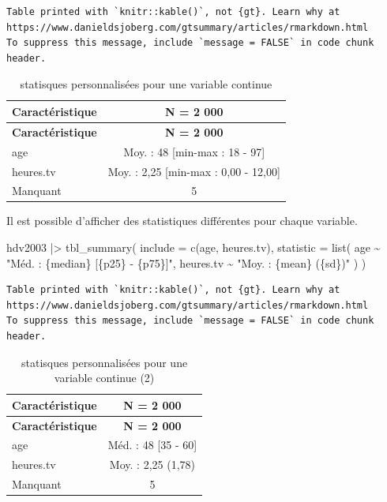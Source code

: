 \documentclass[
  letterpaper,
  DIV=11,
  numbers=noendperiod,
  oneside]{scrreprt}
\newenvironment{Shaded}{\begin{snugshade}}{\end{snugshade}}
\newcommand{\AttributeTok}[1]{\textcolor[rgb]{0.40,0.45,0.13}{#1}}
\newcommand{\FunctionTok}[1]{\textcolor[rgb]{0.28,0.35,0.67}{#1}}
\newcommand{\NormalTok}[1]{\textcolor[rgb]{0.00,0.23,0.31}{#1}}
\newcommand{\SpecialCharTok}[1]{\textcolor[rgb]{0.37,0.37,0.37}{#1}}
\newcommand{\StringTok}[1]{\textcolor[rgb]{0.13,0.47,0.30}{#1}}
\begin{document}
\begin{verbatim}
Table printed with `knitr::kable()`, not {gt}. Learn why at
https://www.danieldsjoberg.com/gtsummary/articles/rmarkdown.html
To suppress this message, include `message = FALSE` in code chunk header.
\end{verbatim}

\hypertarget{tbl-stat-var-cont}{}
\begin{longtable}[]{@{}lc@{}}
\caption{\label{tbl-stat-var-cont}statisques personnalisées pour une
variable continue}\tabularnewline
\toprule()
\textbf{Caractéristique} & \textbf{N = 2 000} \\
\midrule()
\endfirsthead
\toprule()
\textbf{Caractéristique} & \textbf{N = 2 000} \\
\midrule()
\endhead
age & Moy. : 48 {[}min-max : 18 - 97{]} \\
heures.tv & Moy. : 2,25 {[}min-max : 0,00 - 12,00{]} \\
Manquant & 5 \\
\bottomrule()
\end{longtable}

Il est possible d'afficher des statistiques différentes pour chaque
variable.

\begin{Shaded}
\begin{Highlighting}[]
\NormalTok{hdv2003 }\SpecialCharTok{|\textgreater{}}
  \FunctionTok{tbl\_summary}\NormalTok{(}
    \AttributeTok{include =} \FunctionTok{c}\NormalTok{(age, heures.tv),}
    \AttributeTok{statistic =} \FunctionTok{list}\NormalTok{(}
\NormalTok{      age }\SpecialCharTok{\textasciitilde{}} \StringTok{"Méd. : \{median\} [\{p25\} {-} \{p75\}]"}\NormalTok{,}
\NormalTok{      heures.tv }\SpecialCharTok{\textasciitilde{}} \StringTok{"Moy. : \{mean\} (\{sd\})"}
\NormalTok{    )}
\NormalTok{  )}
\end{Highlighting}
\end{Shaded}

\begin{verbatim}
Table printed with `knitr::kable()`, not {gt}. Learn why at
https://www.danieldsjoberg.com/gtsummary/articles/rmarkdown.html
To suppress this message, include `message = FALSE` in code chunk header.
\end{verbatim}

\hypertarget{tbl-stat-var-cont2}{}
\begin{longtable}[]{@{}lc@{}}
\caption{\label{tbl-stat-var-cont2}statisques personnalisées pour une
variable continue (2)}\tabularnewline
\toprule()
\textbf{Caractéristique} & \textbf{N = 2 000} \\
\midrule()
\endfirsthead
\toprule()
\textbf{Caractéristique} & \textbf{N = 2 000} \\
\midrule()
\endhead
age & Méd. : 48 {[}35 - 60{]} \\
heures.tv & Moy. : 2,25 (1,78) \\
Manquant & 5 \\
\bottomrule()
\end{longtable}
\end{document}

